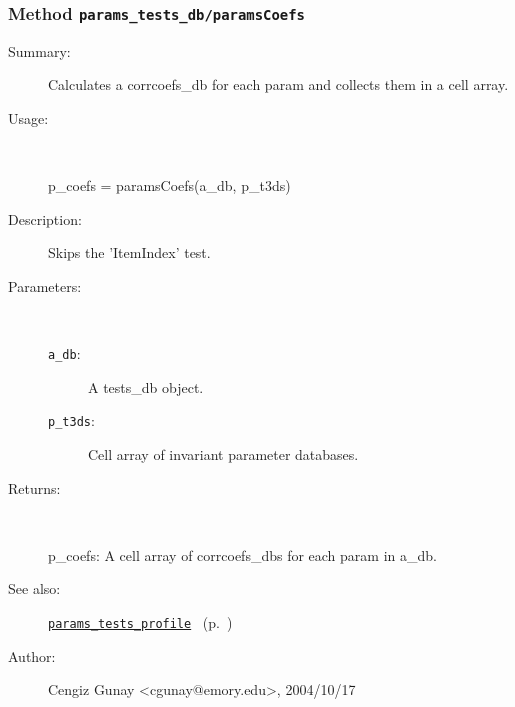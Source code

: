 \subsubsection[Method \texttt{paramsCoefs}]{Method \texttt{params\_tests\_db/paramsCoefs}}%
%
\label{ref_params_tests_db__paramsCoefs}%
\hypertarget{ref_params_tests_db__paramsCoefs}{}%
\begin{description}
\item[Summary:]Calculates a corrcoefs\_db for each param and collects them in a cell array.
%
\item[Usage:]~%
\begin{lyxcode}%
p\_coefs = paramsCoefs(a\_db, p\_t3ds)
%
\end{lyxcode}%
%
\item[Description:]%
Skips the 'ItemIndex' test.
\item[Parameters:]~
\begin{description}%
\item[\texttt{a\_db}:]
 A tests\_db object.
\item[\texttt{p\_t3ds}:]
 Cell array of invariant parameter databases.
\end{description}%
%
\item[Returns:
]~

	p\_coefs: A cell array of corrcoefs\_dbs for each param in a\_db.
%
%
\item[See also:]%
\hyperlink{ref_params_tests_profile}{\texttt{params\_tests\_profile}}%
\ (p.~\pageref{ref_params_tests_profile})%
%
%
\item[Author:]%
Cengiz Gunay <cgunay@emory.edu>, 2004/10/17
%
\end{description}
\methodline%
